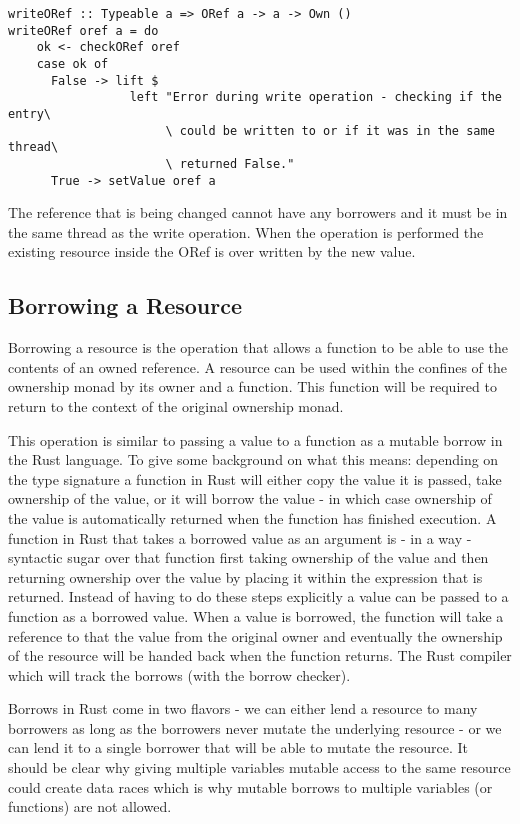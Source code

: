 \documentclass[onehalf,11pt]{beavtex}
\begin{document}
\begin{verbatim}
writeORef :: Typeable a => ORef a -> a -> Own ()
writeORef oref a = do
    ok <- checkORef oref
    case ok of
      False -> lift $ 
                 left "Error during write operation - checking if the entry\
                      \ could be written to or if it was in the same thread\
                      \ returned False."
      True -> setValue oref a
\end{verbatim}

The reference that is being changed cannot have any borrowers and it must
be in the same thread as the write operation.
When the operation is performed the existing resource inside the ORef is over
written by the new value.


\subsection{Borrowing a Resource}

Borrowing a resource is the operation that allows a function to be able to use
the contents of an owned reference.
A resource can be used within the confines of the ownership monad by its owner
and a function. This function will be required to return to the
context of the original ownership monad.

This operation is similar to passing a value to a function as a mutable
borrow in the Rust language.
To give some background on what this means:
depending on the type signature a function in Rust will either copy the value
it is passed, take ownership of the value, or it will borrow the value - in
which case ownership of the value is automatically returned when the function
has finished execution.\cite{rust_book_ownership}
A function in Rust that takes a borrowed value as an argument is - in a way -
syntactic sugar over that function first taking ownership of the value and then
returning ownership over the value by placing it within the expression that is
returned.
Instead of having to do these steps explicitly a value can be passed to a
function as a borrowed value.  When a value is borrowed, the function will take
a reference to that the value from the original owner and eventually the
ownership of the resource will be handed back when the function returns.
The Rust compiler which will track the borrows (with the borrow checker).

Borrows in Rust come in two flavors - we can either lend a resource to many
borrowers as long as the borrowers never mutate the underlying resource - or we
can lend it to a single borrower that will be able to mutate the
resource.\cite{rust_book_borrowing}
It should be clear why giving multiple variables mutable access to
the same resource could create data races which is why mutable borrows to
multiple variables (or functions) are not allowed.
\end{document}
